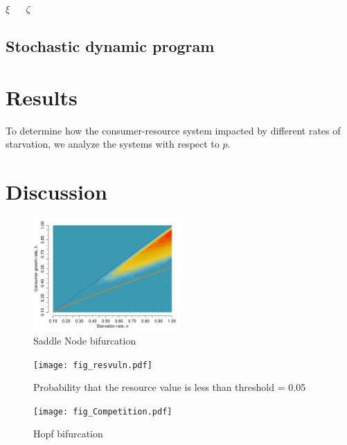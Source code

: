 \documentclass[11pt]{article}
\begin{document}
$\xi$ ~~ $\zeta$

\subsection{Stochastic dynamic program}


\section{Results}

To determine how the consumer-resource system impacted by different rates of starvation, we analyze the systems with respect to $p$.


\section{Discussion}


\begin{figure}[h]
	\centering
	\includegraphics[width=0.5\textwidth]{fig_Hopf.pdf}
	\caption{
	Saddle Node bifurcation
	}
	\label{SN}
\end{figure}


\begin{figure}[h]
	\centering
	\texttt{[image: fig\_resvuln.pdf]}
	\caption{
	Probability that the resource value is less than threshold = 0.05
	}
	\label{SN}
\end{figure}



\begin{figure}[h]
	\centering
	\texttt{[image: fig\_Competition.pdf]}
	\caption{
	Hopf bifurcation
	}
	\label{SN}
\end{figure}
\end{document}
